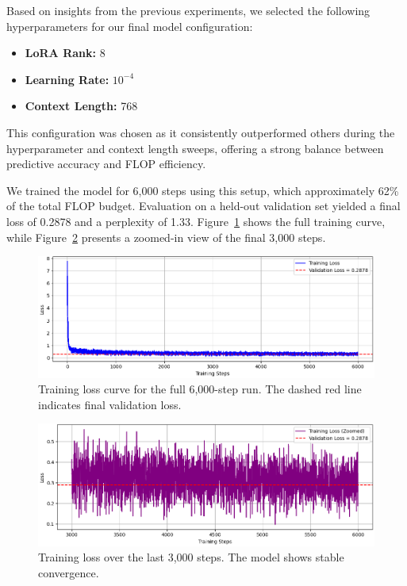 \documentclass[a4paper,12pt]{article}
\begin{document}
Based on insights from the previous experiments, we selected the following hyperparameters for our final model configuration:
\begin{itemize}
    \item \textbf{LoRA Rank:} 8
    \item \textbf{Learning Rate:} $10^{-4}$
    \item \textbf{Context Length:} 768
\end{itemize}

This configuration was chosen as it consistently outperformed others during the hyperparameter and context length sweeps, offering a strong balance between predictive accuracy and FLOP efficiency.

We trained the model for 6,000 steps using this setup, which approximately 62\% of the total FLOP budget. Evaluation on a held-out validation set yielded a final loss of 0.2878 and a perplexity of 1.33. Figure~\ref{fig:training_loss} shows the full training curve, while Figure~\ref{fig:zoomed_training_loss} presents a zoomed-in view of the final 3,000 steps.

\begin{figure}[H]
    \centering
    \includegraphics[width=0.85\linewidth]{training_loss.png}
    \caption{Training loss curve for the full 6,000-step run. The dashed red line indicates final validation loss.}
    \label{fig:training_loss}
\end{figure}

\begin{figure}[H]
    \centering
    \includegraphics[width=0.85\linewidth]{zoomed_training_loss.png}
    \caption{Training loss over the last 3,000 steps. The model shows stable convergence.}
    \label{fig:zoomed_training_loss}
\end{figure}
\end{document}
